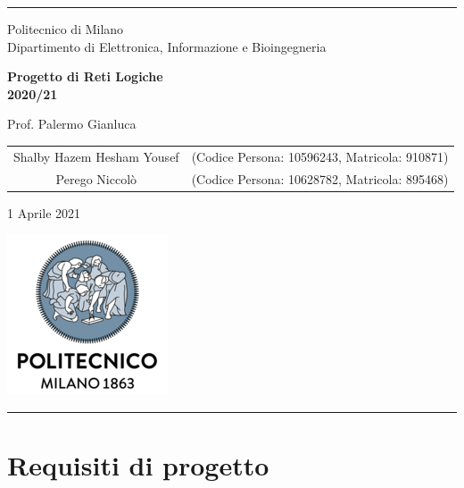 \documentclass{article}
\begin{document}
\begin{titlepage}
    \centering
    \hrule

    \vspace{0,5cm}
    {
        \normalsize Politecnico di Milano\\
	                Dipartimento di Elettronica, Informazione e Bioingegneria \par
    }
    
    \vspace{4,5cm}
    {\Huge \textbf{Progetto di Reti Logiche\\
    2020/21}\\}

    \vspace{0,5cm}
    \large {Prof. Palermo Gianluca}
        
    \vspace{2,5cm}
    {
        \large
        \begin{tabular}{c c}
            Shalby Hazem Hesham Yousef & (Codice Persona: 10596243, Matricola: 910871)\\
            Perego Niccolò & (Codice Persona: 10628782, Matricola: 895468)\\
        \end{tabular}
    
    }
    
    \vspace{5,2cm}

        \normalsize{1 Aprile 2021 \par}
        \vspace{0,3cm}

        \centering\hspace{0,2cm}\includegraphics[scale=0.6]{logo.png}
        \vspace{0,5cm}
        \hrule

\end{titlepage}

\pagebreak

\section{Requisiti di progetto} %
\end{document}
